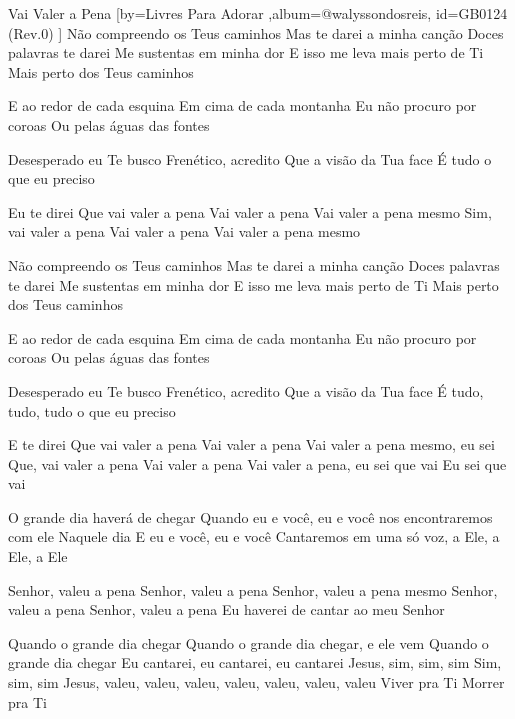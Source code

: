\beginsong
{Vai Valer a Pena %
}[by={Livres Para Adorar %
},album={@walyssondosreis},
id={GB0124 %
(Rev.0) %
}]
Não compreendo os Teus caminhos
Mas te darei a minha canção
Doces palavras te darei
Me sustentas em minha dor
E isso me leva mais perto de Ti
Mais perto dos Teus caminhos

E ao redor de cada esquina
Em cima de cada montanha
Eu não procuro por coroas
Ou pelas águas das fontes

Desesperado eu Te busco
Frenético, acredito
Que a visão da Tua face
É tudo o que eu preciso

Eu te direi
Que vai valer a pena
Vai valer a pena
Vai valer a pena mesmo
Sim, vai valer a pena
Vai valer a pena
Vai valer a pena mesmo

Não compreendo os Teus caminhos
Mas te darei a minha canção
Doces palavras te darei
Me sustentas em minha dor
E isso me leva mais perto de Ti
Mais perto dos Teus caminhos

E ao redor de cada esquina
Em cima de cada montanha
Eu não procuro por coroas
Ou pelas águas das fontes

Desesperado eu Te busco
Frenético, acredito
Que a visão da Tua face
É tudo, tudo, tudo o que eu preciso

E te direi
Que vai valer a pena
Vai valer a pena
Vai valer a pena mesmo, eu sei
Que, vai valer a pena
Vai valer a pena
Vai valer a pena, eu sei que vai
Eu sei que vai

O grande dia haverá de chegar
Quando eu e você, eu e você nos encontraremos com ele
Naquele dia
E eu e você, eu e você
Cantaremos em uma só voz, a Ele, a Ele, a Ele

Senhor, valeu a pena
Senhor, valeu a pena
Senhor, valeu a pena mesmo
Senhor, valeu a pena
Senhor, valeu a pena
Eu haverei de cantar ao meu Senhor

Quando o grande dia chegar
Quando o grande dia chegar, e ele vem
Quando o grande dia chegar
Eu cantarei, eu cantarei, eu cantarei
Jesus, sim, sim, sim
Sim, sim, sim
Jesus, valeu, valeu, valeu, valeu, valeu, valeu, valeu
Viver pra Ti
Morrer pra Ti


